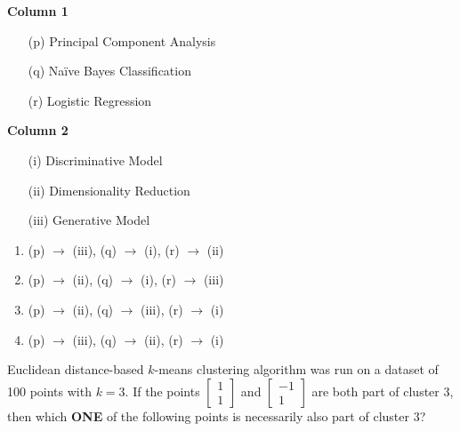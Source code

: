\begin{multicols}{2}
\textbf{Column 1}
\begin{enumerate}
    \item[(p)] Principal Component Analysis
    \item[(q)] Naïve Bayes Classification
    \item[(r)] Logistic Regression
\end{enumerate}

\columnbreak

\textbf{Column 2}
\begin{enumerate}
    \item[(i)] Discriminative Model
    \item[(ii)] Dimensionality Reduction
    \item[(iii)] Generative Model
\end{enumerate}
\end{multicols}

\begin{enumerate}
    \item (p) $ \rightarrow $ (iii), (q) $ \rightarrow $ (i), (r) $ \rightarrow $ (ii)
    \item (p) $ \rightarrow $ (ii), (q) $ \rightarrow $ (i), (r) $ \rightarrow $ (iii)
    \item (p) $ \rightarrow $ (ii), (q) $ \rightarrow $ (iii), (r) $ \rightarrow $ (i)
    \item (p) $ \rightarrow $ (iii), (q) $ \rightarrow $ (ii), (r) $ \rightarrow $ (i)
\end{enumerate}

\item Euclidean distance-based $ k $-means clustering algorithm was run on a dataset of 100 points with $ k = 3 $. If the points $ \begin{bmatrix} 1 \\ 1 \end{bmatrix} $ and $ \begin{bmatrix} -1 \\ 1 \end{bmatrix} $ are both part of cluster 3, then which \textbf{ONE} of the following points is necessarily also part of cluster 3?


